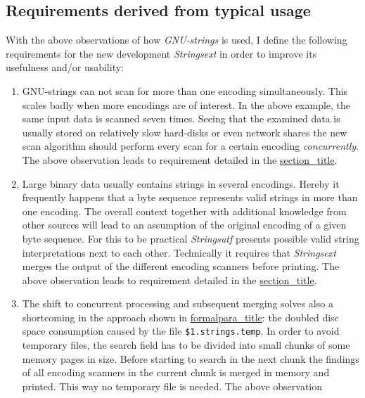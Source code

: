 \hypertarget{_requirements_derived_from_typical_usage}{\subsection{Requirements
derived from typical
usage}\label{_requirements_derived_from_typical_usage}}

With the above observations of how \emph{GNU-strings} is used, I define
the following requirements for the new development \emph{Strings­ext} in
order to improve its usefulness and/or usability:

\begin{enumerate}
\def\labelenumi{\arabic{enumi}.}
\item
  GNU-strings can not scan for more than one encoding simultaneously.
  This scales badly when more encodings are of interest. In the above
  example, the same input data is scanned seven times. Seeing that the
  examined data is usually stored on relatively slow hard-disks or even
  network shares the new scan algorithm should perform every scan for a
  certain encoding \emph{concurrently}. The above observation leads to
  requirement detailed in the
  \protect\hyperlink{req-concurrent}{section\_title}.
\item
  Large binary data usually contains strings in several encodings.
  Hereby it frequently happens that a byte sequence represents valid
  strings in more than one encoding. The overall context together with
  ad­di­tional knowledge from other sources will lead to an assumption
  of the ori­ginal encoding of a given byte sequence. For this to be
  practical \emph{Strings­utf} presents possible valid string
  interpretations next to each other. Technically it requires that
  \emph{Strings­ext} merges the output of the different encoding
  scanners before printing. The above observation leads to requirement
  detailed in the
  \protect\hyperlink{req-merge-findings}{section\_title}.
\item
  The shift to concurrent processing and subsequent merging solves also
  a shortcoming in the approach shown in
  \protect\hyperlink{strings-typical-usage}{formalpara\_title}: the
  doubled disc space consumption caused by the file
  \texttt{\$1.strings.temp}. In order to avoid temporary files, the
  search field has to be divided into small chunks of some memory pages
  in size. Before starting to search in the next chunk the findings of
  all encoding scanners in the current chunk is merged in memory and
  printed. This way no temporary file is needed. The above observation

\end{enumerate}
